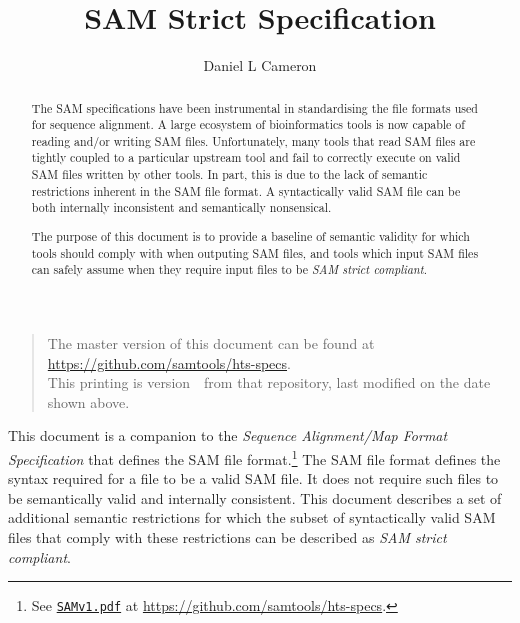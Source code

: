 \documentclass[10pt]{article}
\begin{document}

\title{SAM Strict Specification}
\author{Daniel L Cameron}
\date{\headdate}
\maketitle
\begin{quote}\small
The master version of this document can be found at
\url{https://github.com/samtools/hts-specs}.\\
This printing is version~\commitdesc\ from that repository,
last modified on the date shown above.
\end{quote}
\vspace*{1em}

\noindent
This document is a companion to the {\sl Sequence Alignment/Map Format
Specification} that defines the SAM file format.\footnote{See
\href{http://samtools.github.io/hts-specs/SAMv1.pdf}{\tt SAMv1.pdf} at \url{https://github.com/samtools/hts-specs}.}
The SAM file format defines the syntax required for a file to be
a valid SAM file. It does not require such files to be semantically
valid and internally consistent.
This document describes a set of additional semantic restrictions
for which the subset of syntactically valid SAM files that comply
with these restrictions can be described as \textit{SAM strict
compliant}.

\renewcommand{\abstractname}{Introduction}
\begin{abstract}

The SAM specifications have been instrumental in standardising
the file formats used for sequence alignment. A large ecosystem of
bioinformatics tools is now capable of reading and/or writing
SAM files. Unfortunately, many tools that read SAM files are tightly
coupled to a particular upstream tool 
and fail to correctly execute on valid SAM files written by other
tools. In part, this is due to the lack of semantic restrictions
inherent in the SAM file format. A syntactically valid SAM file
can be both internally inconsistent and semantically nonsensical.

The purpose of this document is to provide a baseline of semantic
validity for which tools should comply with when outputing SAM
files, and tools which input SAM files can safely assume when
they require input files to be \textit{SAM strict compliant}.

\end{abstract}
\end{document}
